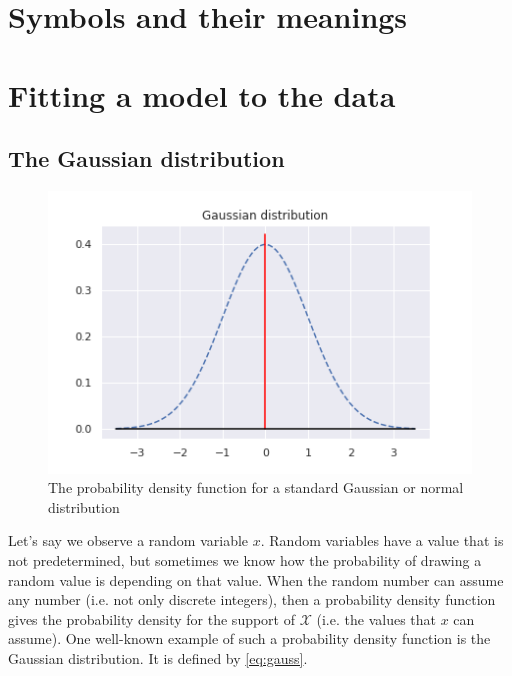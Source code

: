 \newpage


\chapter{Symbols and their meanings}
\printunsrtglossary[type=symbols,style=long]

\chapter{Fitting a model to the data}

\section{The Gaussian distribution}

\begin{figure}
    \centering
    \includegraphics[width=\linewidth]{figs/normal_dist.png}
    \caption{The probability density function for a standard Gaussian or normal distribution}
    \label{fig:my_label}
\end{figure}

Let's say we observe a random variable $x$. Random variables have a value that is not predetermined, but sometimes we know how the probability of drawing a random value is depending on that value. When the random number can assume any number (i.e. not only discrete integers), then a probability density function gives the probability density for the support of $\mathcal{X}$ (i.e. the values that $x$ can assume). One well-known example of such a probability density function is the Gaussian distribution. It is defined by \ref{eq:gauss}.

